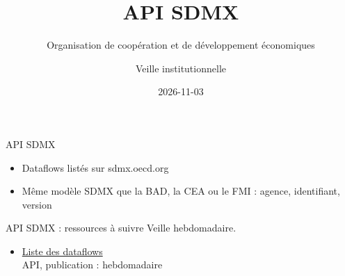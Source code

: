 \documentclass[aspectratio=169,11pt]{beamer}
\title{API SDMX}
\subtitle{Organisation de coopération et de développement économiques}
\author{Veille institutionnelle}
\date{2026-11-03}
\begin{document}
\begin{frame}\titlepage\end{frame}

\begin{frame}{API SDMX}
\begin{itemize}
\item Dataflows listés sur sdmx.oecd.org
\item Même modèle SDMX que la BAD, la CEA ou le FMI : agence, identifiant, version
\end{itemize}
\end{frame}

\begin{frame}{API SDMX : ressources à suivre}
\small
Veille hebdomadaire.
\begin{itemize}
\item \href{https://sdmx.oecd.org/public/rest/dataflow}{Liste des dataflows}\\{\footnotesize API, publication : hebdomadaire}
\end{itemize}
\end{frame}
\end{document}
